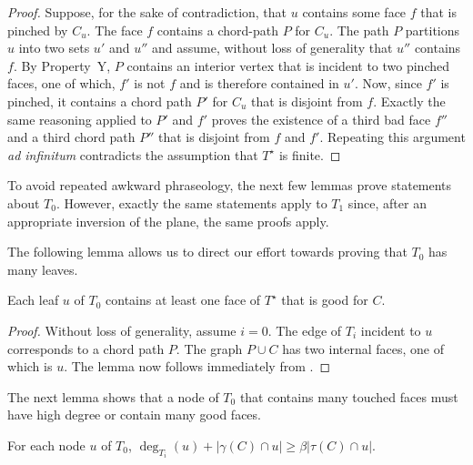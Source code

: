 \documentclass{patmorin}
\newcommand{\dual}[1]{{#1}^\star}
\begin{document}
\begin{proof}
   Suppose, for the sake of contradiction, that $u$ contains some face
   $f$ that is pinched by $C_u$.  The face $f$ contains a chord-path
   $P$ for $C_u$. The path $P$ partitions $u$ into two sets $u'$ and
   $u''$ and assume, without loss of generality that $u''$ contains $f$.
   By Property~Y, $P$ contains an interior vertex that is incident to two
   pinched faces, one of which, $f'$ is not $f$ and is therefore contained
   in $u'$.  Now, since $f'$ is pinched, it contains a chord path $P'$
   for $C_u$ that is disjoint from $f$.  Exactly the same reasoning
   applied to $P'$ and $f'$ proves the existence of a third bad face $f''$
   and a third chord path $P''$ that is disjoint from $f$ and $f'$.
   Repeating this argument \emph{ad infinitum} contradicts the assumption
   that $\dual{T}$ is finite.
\end{proof}

To avoid repeated awkward phraseology, the next few lemmas prove
statements about $T_0$.  However, exactly the same statements apply
to $T_1$ since, after an appropriate inversion of the plane, the same
proofs apply.

The following lemma allows us to direct our effort towards proving that
$T_0$ has many leaves.

\begin{lem}
   Each leaf $u$ of $T_0$ contains at least one face of $\dual{T}$
   that is good for $C$.
\end{lem}

\begin{proof}
   Without loss of generality, assume $i=0$.  The edge of $T_i$ incident
   to $u$ corresponds to a chord path $P$. The graph $P\cup C$ has two
   internal faces, one of which is $u$.  The lemma now follows immediately
   from .
\end{proof}

The next lemma shows that a node of $T_0$ that contains many touched
faces must have high degree or contain many good faces.
\begin{lem}
   For each node $u$ of $T_0$,  $\deg_{T_i}(u)+|\gamma(C)\cap u|\ge
   \beta|\tau(C)\cap u|$.
\end{lem}
\end{document}
